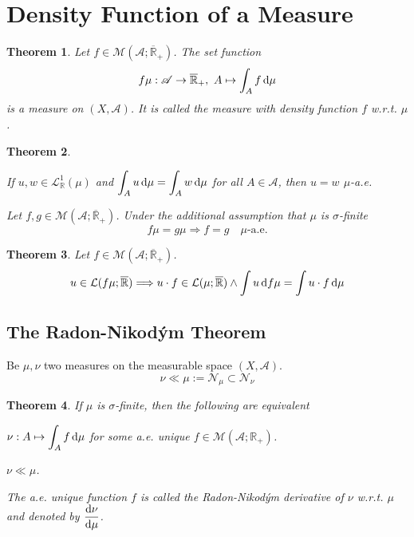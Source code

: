 \documentclass[11pt, a4paper, openany]{book}
\newtheorem{thm}{Theorem}\newtheorem{lem}{Lemma}\newtheorem{crl}{Corollary}
\theoremstyle{definition}
\newenvironment{tight_enumerate}{\begin{enumerate}\itemsep -0.2em}{\end{enumerate}}
\begin{document}
\section{Density Function of a Measure}
    \begin{thm}
        Let $f\in \mathcal{M}(\mathscr{A};\overline{\mathbb{R}}_+)$. The set function
        \[
            f\mu:\mathscr{A}\rightarrow \overline{\mathbb{R}}_+,\,\,A\mapsto \int_A f\odif \mu
        \]
        is a measure on $(X,\mathscr{A})$. It is called the measure with density function $f$ w.r.t. $\mu$.
    \end{thm}
    \begin{thm}
        \begin{tight_enumerate}
            \item If $u,w\in\mathcal{L}_{\mathbb{R}}^1(\mu)$ and $\displaystyle \int_A u\odif \mu=\int_A w\odif \mu$ for all $A\in\mathscr{A}$, then $u=w$ $\mu$-a.e.
            \item Let $f,g\in\mathcal{M}(\mathscr{A};\overline{\mathbb{R}}_+)$. Under the additional assumption that $\mu$ is $\sigma$-finite
            \[f\mu=g\mu\Longrightarrow f=g\quad\mu\text{-a.e.}\]
        \end{tight_enumerate}
    \end{thm}
    \begin{thm}
        Let $f\in \mathcal{M}(\mathscr{A};\overline{\mathbb{R}}_+)$.
        \[u\in \mathcal{L}(f\mu;\overline{\mathbb{R}})\Longrightarrow u\cdot f\in \mathcal{L}(\mu;\overline{\mathbb{R}})\wedge\int u\odif{f\mu}=\int u\cdot f\odif \mu\]
    \end{thm}
\subsection{The Radon-Nikod\'{y}m Theorem}
    Be $\mu,\nu$ two measures on the measurable space $(X,\mathscr{A})$. 
    \[\nu\ll\mu:=\mathscr{N}_\mu\subset\mathscr{N}_{\nu}\]
    \begin{thm}
        If $\mu$ is $\sigma$-finite, then the following are equivalent
        \begin{tight_enumerate}
            \item $\nu:A\mapsto \displaystyle \int_A f\odif\mu$ for some a.e. unique $f\in\mathcal{M}(\mathscr{A};\mathbb{R}_+)$.
            \item $\nu\ll\mu$.
        \end{tight_enumerate}
        The a.e. unique function $f$ is called the Radon-Nikod\'{y}m derivative of $\nu$ w.r.t. $\mu$ and denoted by $\displaystyle \frac{\odif\nu}{\odif\mu}$.
    \end{thm}
\end{document}
